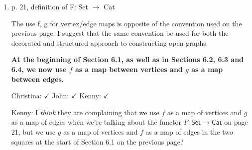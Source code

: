 \documentclass[reqno]{amsart}
\def\chris{\color{purple} Christina: }
\def\john{\color{red} John: }
\def\kenny{\color{blue} Kenny: }
\begin{document}
\begin{enumerate}
{Also, I'd better change the remark about  $\theta: EF \Rightarrow F'H$  on page 9, and
 in the statement of Theorem 2.5 --- these are two cases where we called it a ``natural 
isomorphism''.    I'll do this now: I'll change it to a ``natural transformation''.

I've thanked the referee profusely for catching this problem --- check out my response in boldface
above, and if you're happy, we can check this one off!}

{\chris The response looks great, see my small addition above. I seached ``isomorphism'' the whole document and I think we are fine (but perhaps 
Kenny can double check). Except this one place where I changed it to transformation above Theorem 2.5, check that it doesn't break anything? It looks 
OK to me.}

{\kenny I also checked the entire document for `isomorphism' and didn't see any left over from this situation. Christina's catch on Zulip was a great one, and the response looks good to me.}

\item p. 21, definition of F: Set $\to$ Cat

The use f, g for vertex/edge maps is opposite of the convention used on the previous page. I suggest that the same convention be used for both the 
decorated and structured approach to constructing open graphs.

{\bf At the beginning of Section 6.1, as well as in Sections 6.2, 6.3 and 6.4, we now use $f$ as a map between vertices and $g$ as a map 
between edges.} 

{\chris $\checkmark$} {\john $\checkmark$} {\kenny  $\checkmark$}





\iffalse
{\kenny I \emph{think} they are complaining that we use $f$ as a map of vertices and $g$ as a map of edges when we're talking about the functor $F \colon \mathsf{Set} \to \mathsf{Cat}$ on page 21, but we use $g$ as a map of vertices and $f$ as a map of edges in the two squares at the start of Section 6.1 on the previous page?}


\end{enumerate}
\end{document}
